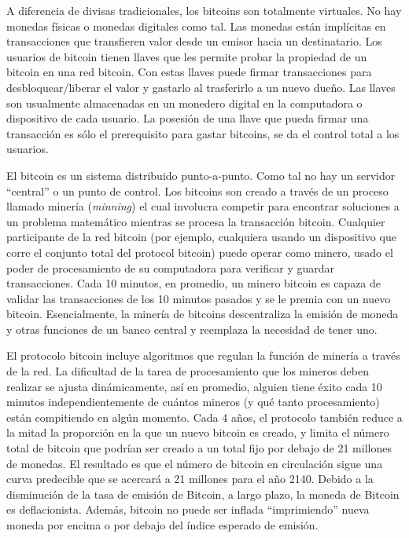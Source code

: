 \documentclass[10pt,journal,compsoc]{IEEEtran}
\begin{document}
A diferencia de divisas tradicionales, los bitcoins son totalmente virtuales. No hay monedas físicas o monedas digitales como tal. Las monedas están implícitas en transacciones que transfieren valor desde un emisor hacia un destinatario. Los usuarios de bitcoin tienen llaves que les permite probar la propiedad de un bitcoin en una red bitcoin. Con estas llaves puede firmar transacciones para desbloquear/liberar el valor y gastarlo al trasferirlo a un nuevo dueño. Las llaves son usualmente almacenadas en un monedero digital en la computadora o dispositivo de cada usuario. La posesión de una llave que pueda firmar una transacción es sólo el prerequisito para gastar bitcoins, se da el control total a los usuarios.

El bitcoin es un sistema distribuido punto-a-punto. Como tal no hay un servidor ``central'' o un punto de control. Los bitcoins son creado a través de un proceso llamado minería (\emph{minning}) el cual involucra competir para encontrar soluciones a un problema matemático mientras se procesa la transacción bitcoin. Cualquier participante de la red bitcoin (por ejemplo, cualquiera usando un dispositivo que corre el conjunto total del protocol bitcoin) puede operar como minero, usado el poder de procesamiento de su computadora para verificar y guardar transacciones. Cada 10 minutos, en promedio, un minero bitcoin es capaza de validar las transacciones de los 10 minutos pasados y se le premia con un nuevo bitcoin. Esencialmente, la minería de bitcoins descentraliza la emisión de moneda y otras funciones de un banco central y reemplaza la necesidad de tener uno.

El protocolo bitcoin incluye algoritmos que regulan la función de minería a través de la red. La dificultad de la tarea de procesamiento que los mineros deben realizar se ajusta dinámicamente, así en promedio, alguien tiene éxito cada 10 minutos independientemente de cuántos mineros (y qué tanto procesamiento) están compitiendo en algún momento. Cada 4 años, el protocolo también reduce a la mitad la proporción en la que un nuevo bitcoin es creado, y limita el número total de bitcoin que podrían ser creado a un total fijo por debajo de 21 millones de monedas. El resultado es que el número de bitcoin en circulación sigue una curva predecible que se acercará a 21 millones para el año 2140. Debido a la disminución de la tasa de emisión de Bitcoin, a largo plazo, la moneda de Bitcoin es deflacionista. Además, bitcoin no puede ser inflada ``imprimiendo'' nueva moneda por encima o por debajo del índice esperado de emisión.
\end{document}
